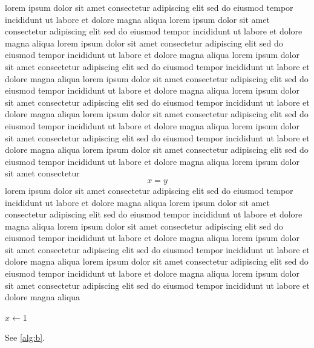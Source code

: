 \documentclass{article}
\begin{document}
lorem ipsum dolor sit amet consectetur adipiscing elit sed do eiusmod tempor incididunt ut labore et dolore magna aliqua lorem ipsum dolor sit amet consectetur adipiscing elit sed do eiusmod tempor incididunt ut labore et dolore magna aliqua lorem ipsum dolor sit amet consectetur adipiscing elit sed do eiusmod tempor incididunt ut labore et dolore magna aliqua lorem ipsum dolor sit amet consectetur adipiscing elit sed do eiusmod tempor incididunt ut labore et dolore magna aliqua lorem ipsum dolor sit amet consectetur adipiscing elit sed do eiusmod tempor incididunt ut labore et dolore magna aliqua lorem ipsum dolor sit amet consectetur adipiscing elit sed do eiusmod tempor incididunt ut labore et dolore magna aliqua lorem ipsum dolor sit amet consectetur adipiscing elit sed do eiusmod tempor incididunt ut labore et dolore magna aliqua lorem ipsum dolor sit amet consectetur adipiscing elit sed do eiusmod tempor incididunt ut labore et dolore magna aliqua lorem ipsum dolor sit amet consectetur adipiscing elit sed do eiusmod tempor incididunt ut labore et dolore magna aliqua lorem ipsum dolor sit amet consectetur
\[ x = y \]
lorem ipsum dolor sit amet consectetur adipiscing elit sed do eiusmod tempor incididunt ut labore et dolore magna aliqua lorem ipsum dolor sit amet consectetur adipiscing elit sed do eiusmod tempor incididunt ut labore et dolore magna aliqua lorem ipsum dolor sit amet consectetur adipiscing elit sed do eiusmod tempor incididunt ut labore et dolore magna aliqua lorem ipsum dolor sit amet consectetur adipiscing elit sed do eiusmod tempor incididunt ut labore et dolore magna aliqua lorem ipsum dolor sit amet consectetur adipiscing elit sed do eiusmod tempor incididunt ut labore et dolore magna aliqua lorem ipsum dolor sit amet consectetur adipiscing elit sed do eiusmod tempor incididunt ut labore et dolore magna aliqua
\begin{algorithm}[H]
\caption{Here}
\label{alg:b}
\begin{algorithmic}
\State $x \gets 1$
\end{algorithmic}
\end{algorithm}
See \cref{alg:b}.
\end{document}
